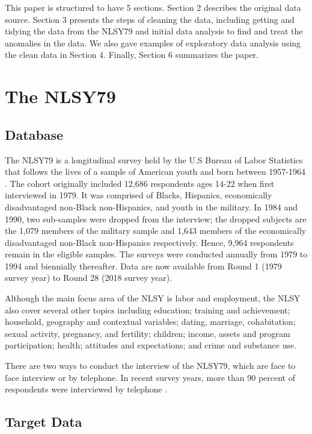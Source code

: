 This paper is structured to have 5 sections. Section 2 describes the
original data source. Section 3 presents the steps of cleaning the data,
including getting and tidying the data from the NLSY79 and initial data
analysis to find and treat the anomalies in the data. We also gave
examples of exploratory data analysis using the clean data in Section 4.
Finally, Section 6 summarizes the paper.

\hypertarget{the-nlsy79}{%
\section{The NLSY79}\label{the-nlsy79}}

\hypertarget{database}{%
\subsection{Database}\label{database}}

The NLSY79 is a longitudinal survey held by the U.S Bureau of Labor
Statistics that follows the lives of a sample of American youth and born
between 1957-1964 \citep{nlsy79}. The cohort originally included 12,686
respondents ages 14-22 when first interviewed in 1979. It was comprised
of Blacks, Hispanics, economically disadvantaged non-Black
non-Hispanics, and youth in the military. In 1984 and 1990, two
sub-samples were dropped from the interview; the dropped subjects are
the 1,079 members of the military sample and 1,643 members of the
economically disadvantaged non-Black non-Hispanics respectively. Hence,
9,964 respondents remain in the eligible samples. The surveys were
conducted annually from 1979 to 1994 and biennially thereafter. Data are
now available from Round 1 (1979 survey year) to Round 28 (2018 survey
year).

Although the main focus area of the NLSY is labor and employment, the
NLSY also cover several other topics including education; training and
achievement; household, geography and contextual variables; dating,
marriage, cohabitation; sexual activity, pregnancy, and fertility;
children; income, assets and program participation; health; attitudes
and expectations; and crime and substance use.

There are two ways to conduct the interview of the NLSY79, which are
face to face interview or by telephone. In recent survey years, more
than 90 percent of respondents were interviewed by telephone
\citep{eliznlsy}.

\hypertarget{target-data}{%
\subsection{Target Data}\label{target-data}}

